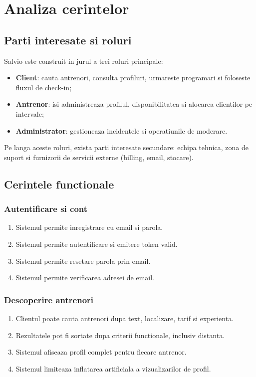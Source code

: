 \chapter{Analiza cerintelor}

\section{Parti interesate si roluri}

Salvio este construit in jurul a trei roluri principale:
\begin{itemize}[leftmargin=1.2cm]
    \item \textbf{Client}: cauta antrenori, consulta profiluri, urmareste programari si foloseste fluxul de check-in;
    \item \textbf{Antrenor}: isi administreaza profilul, disponibilitatea si alocarea clientilor pe intervale;
    \item \textbf{Administrator}: gestioneaza incidentele si operatiunile de moderare.
\end{itemize}

Pe langa aceste roluri, exista parti interesate secundare: echipa tehnica, zona de suport si furnizorii de servicii externe (billing, email, stocare).

\section{Cerintele functionale}

\subsection{Autentificare si cont}

\begin{enumerate}[leftmargin=1.2cm]
    \item Sistemul permite inregistrare cu email si parola.
    \item Sistemul permite autentificare si emitere token valid.
    \item Sistemul permite resetare parola prin email.
    \item Sistemul permite verificarea adresei de email.
\end{enumerate}

\subsection{Descoperire antrenori}

\begin{enumerate}[leftmargin=1.2cm]
    \item Clientul poate cauta antrenori dupa text, localizare, tarif si experienta.
    \item Rezultatele pot fi sortate dupa criterii functionale, inclusiv distanta.
    \item Sistemul afiseaza profil complet pentru fiecare antrenor.
    \item Sistemul limiteaza inflatarea artificiala a vizualizarilor de profil.
\end{enumerate}

